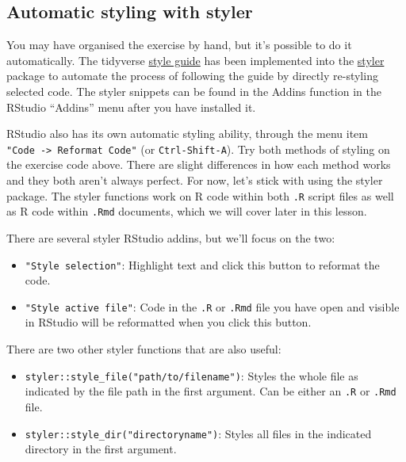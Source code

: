 \documentclass[]{Nemilov}
\providecommand{\tightlist}{%
  \setlength{\itemsep}{0pt}\setlength{\parskip}{0pt}}
\begin{document}
\hypertarget{automatic-styling-with-styler}{%
\subsection{Automatic styling with styler}\label{automatic-styling-with-styler}}

You may have organised the exercise by hand, but it's possible to do it
automatically. The tidyverse \href{https://style.tidyverse.org/}{style guide} has been implemented
into the \href{http://styler.r-lib.org/}{styler} package to automate the process of following the
guide by directly re-styling selected code. The styler snippets can be found in
the Addins function in the RStudio ``Addins'' menu after you have installed it.

RStudio also has its own automatic styling ability, through the menu item \texttt{"Code\ -\textgreater{}\ Reformat\ Code"} (or \texttt{Ctrl-Shift-A}). Try both methods of styling on the exercise
code above. There are slight differences in how each method works and they both
aren't always perfect. For now, let's stick with using the styler package. The
styler functions work on R code within both \texttt{.R} script files as well as R code
within \texttt{.Rmd} documents, which we will cover later in this lesson.

There are several styler RStudio addins, but we'll focus on the two:

\begin{itemize}
\tightlist
\item
  \texttt{"Style\ selection"}: Highlight text and click this button to reformat the code.
\item
  \texttt{"Style\ active\ file"}: Code in the \texttt{.R} or \texttt{.Rmd} file you have open and
  visible in RStudio will be reformatted when you click this button.
\end{itemize}

There are two other styler functions that are also useful:

\begin{itemize}
\tightlist
\item
  \texttt{styler::style\_file("path/to/filename")}: Styles the whole file as indicated by the
  file path in the first argument. Can be either an \texttt{.R} or \texttt{.Rmd} file.
\item
  \texttt{styler::style\_dir("directoryname")}: Styles all files in the indicated directory
  in the first argument.
\end{itemize}
\end{document}
